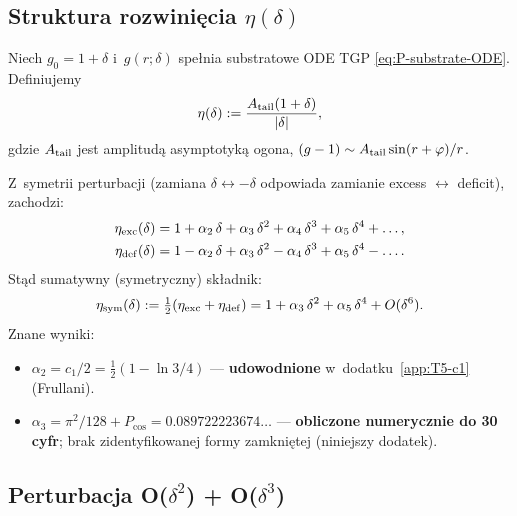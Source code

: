 \subsection{Struktura rozwini\k{e}cia $\eta(\delta)$}
\label{sec:T6-structure}

Niech $g_0 = 1 + \delta$ i~$g(r; \delta)$ spe\l{}nia substratowe ODE TGP
\eqref{eq:P-substrate-ODE}. Definiujemy
\begin{equation}
  \eta(\delta) := \frac{A_{\rm tail}(1+\delta)}{|\delta|},
\end{equation}
gdzie $A_{\rm tail}$ jest amplitud\k{a} asymptotyk\k{a} ogona,
$(g-1) \sim A_{\rm tail}\sin(r+\varphi)/r$.

Z~symetrii perturbacji (zamiana $\delta \leftrightarrow -\delta$
odpowiada zamianie excess $\leftrightarrow$ deficit), zachodzi:
\begin{align}
  \eta_{\rm exc}(\delta) &= 1 + \alpha_2\,\delta + \alpha_3\,\delta^2 + \alpha_4\,\delta^3 + \alpha_5\,\delta^4 + \dots, \\
  \eta_{\rm def}(\delta) &= 1 - \alpha_2\,\delta + \alpha_3\,\delta^2 - \alpha_4\,\delta^3 + \alpha_5\,\delta^4 - \dots.
\end{align}
St\k{a}d sumatywny (symetryczny) sk\l{}adnik:
\begin{equation}
  \eta_{\rm sym}(\delta) := \tfrac{1}{2}(\eta_{\rm exc} + \eta_{\rm def})
    = 1 + \alpha_3\,\delta^2 + \alpha_5\,\delta^4 + O(\delta^6).
\end{equation}
Znane wyniki:
\begin{itemize}
  \item $\alpha_2 = c_1/2 = \tfrac{1}{2}(1 - \ln 3/4)$ --- \textbf{udowodnione}
        w~dodatku~\ref{app:T5-c1} (Frullani).
  \item $\alpha_3 = \pi^2/128 + P_{\cos} = 0.089722223674\ldots$ --- \textbf{obliczone
        numerycznie do 30 cyfr}; brak zidentyfikowanej formy zamkni\k{e}tej
        (niniejszy dodatek).
\end{itemize}

\subsection{Perturbacja O($\delta^2$) + O($\delta^3$)}
\label{sec:T6-perturbation}


